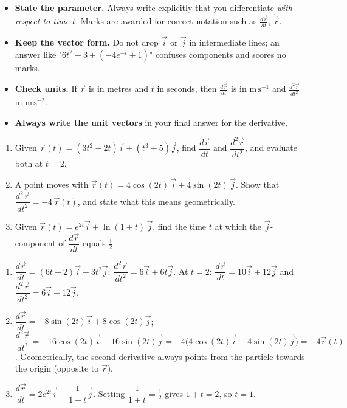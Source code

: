 \documentclass[11pt]{article}
\begin{document}
\begin{attention}
\begin{itemize}
\item \textbf{State the parameter.} Always write explicitly that you differentiate \emph{with respect to time $t$}. Marks are awarded for correct notation such as $\frac{d\vec{r}}{dt}$, $\dot{\vec{r}}$.
\item \textbf{Keep the vector form.} Do not drop $\vec{i}$ or $\vec{j}$ in intermediate lines; an answer like "$6t^2 - 3 + (-4e^{-t} + 1)$" confuses components and scores no marks.
\item \textbf{Check units.} If $\vec{r}$ is in metres and $t$ in seconds, then $\frac{d\vec{r}}{dt}$ is in $\mathrm{m\,s^{-1}}$ and $\frac{d^2\vec{r}}{dt^2}$ in $\mathrm{m\,s^{-2}}$.
\item \textbf{Always write the unit vectors} in your final answer for the derivative.
\end{itemize}
\end{attention}

\begin{exercice}[Practice]
\begin{enumerate}
\item Given $\vec{r}(t) = (3t^2 - 2t)\vec{i} + (t^3 + 5)\vec{j}$, find $\dfrac{d\vec{r}}{dt}$ and $\dfrac{d^2\vec{r}}{dt^2}$, and evaluate both at $t = 2$.
\item A point moves with $\vec{r}(t) = 4\cos(2t)\,\vec{i} + 4\sin(2t)\,\vec{j}$. Show that $\dfrac{d^2\vec{r}}{dt^2} = -4\,\vec{r}(t)$, and state what this means geometrically.
\item Given $\vec{r}(t) = e^{2t}\vec{i} + \ln(1+t)\,\vec{j}$, find the time $t$ at which the $\vec{j}$-component of $\dfrac{d\vec{r}}{dt}$ equals $\tfrac{1}{2}$.
\end{enumerate}
\end{exercice}

\begin{corrige}[Exercise 1]
\begin{enumerate}
\item $\dfrac{d\vec{r}}{dt} = (6t - 2)\vec{i} + 3t^2\vec{j}$; $\dfrac{d^2\vec{r}}{dt^2} = 6\vec{i} + 6t\vec{j}$. At $t = 2$: $\dfrac{d\vec{r}}{dt} = 10\vec{i} + 12\vec{j}$ and $\dfrac{d^2\vec{r}}{dt^2} = 6\vec{i} + 12\vec{j}$.
\item $\dfrac{d\vec{r}}{dt} = -8\sin(2t)\vec{i} + 8\cos(2t)\vec{j}$; $\dfrac{d^2\vec{r}}{dt^2} = -16\cos(2t)\vec{i} - 16\sin(2t)\vec{j} = -4\big(4\cos(2t)\vec{i} + 4\sin(2t)\vec{j}\big) = -4\vec{r}(t)$. Geometrically, the second derivative always points from the particle towards the origin (opposite to $\vec{r}$).
\item $\dfrac{d\vec{r}}{dt} = 2e^{2t}\vec{i} + \dfrac{1}{1+t}\vec{j}$. Setting $\dfrac{1}{1+t} = \tfrac12$ gives $1 + t = 2$, so $t = 1$.
\end{enumerate}
\end{corrige}
\end{document}
